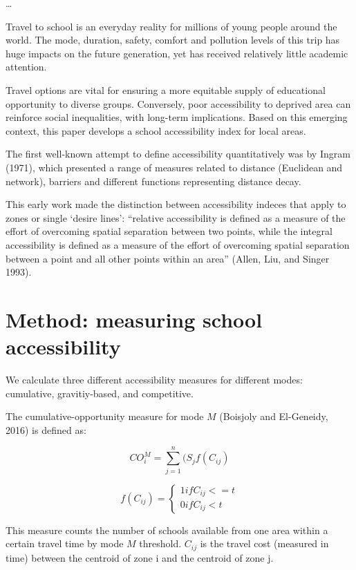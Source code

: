 \documentclass[]{article}
\begin{document}
\ldots{}

Travel to school is an everyday reality for millions of young people
around the world. The mode, duration, safety, comfort and pollution
levels of this trip has huge impacts on the future generation, yet has
received relatively little academic attention.

Travel options are vital for ensuring a more equitable supply of
educational opportunity to diverse groups. Conversely, poor
accessibility to deprived area can reinforce social inequalities, with
long-term implications. Based on this emerging context, this paper
develops a school accessibility index for local areas.

The first well-known attempt to define accessibility quantitatively was
by Ingram (1971), which presented a range of measures related to
distance (Euclidean and network), barriers and different functions
representing distance decay.

This early work made the distinction between accessibility indeces that
apply to zones or single `desire lines': ``relative accessibility is
defined as a measure of the effort of overcoming spatial separation
between two points, while the integral accessibility is defined as a
measure of the effort of overcoming spatial separation between a point
and all other points within an area'' (Allen, Liu, and Singer 1993).

\section{Method: measuring school
accessibility}\label{method-measuring-school-accessibility}

We calculate three different accessibility measures for different modes:
cumulative, gravitiy-based, and competitive.

The cumulative-opportunity measure for mode \(M\) (Boisjoly and
El-Geneidy, 2016) is defined as:

\[ CO_{i}^M= \sum_{j=1}^n(S_{j}f(C_{ij}) \]

\[ f(C_{ij}) = \left\{ 
                \begin{array}{ll}
                  1 if C_{ij}<=t\\
                  0 if C_{ij}<t
                \end{array}
              \right.
  \]

This measure counts the number of schools available from one area within
a certain travel time by mode \(M\) threshold. \(C_{ij}\) is the travel
cost (measured in time) between the centroid of zone i and the centroid
of zone j.
\end{document}
